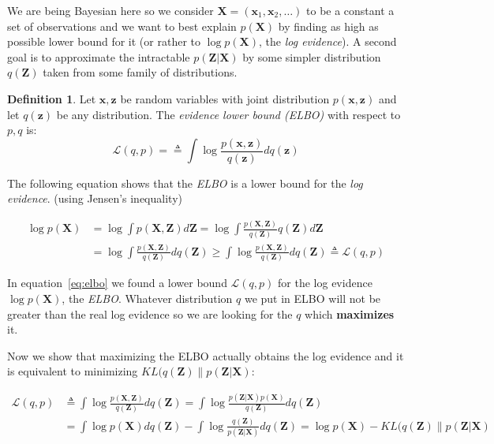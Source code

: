 \documentclass[11pt, a4paper]{report}
\theoremstyle{plain}
\theoremstyle{definition}
\newtheorem{mydef}{Definition}[chapter]
\theoremstyle{remark}
\newcommand{\bv}[1]{\boldsymbol{#1}}
\begin{document}
We are being Bayesian here so we consider $\bv{X} = (\bv{x}_1, \bv{x}_2, \dots)$ to be
a constant a set of observations and we want to best explain $p(\bv{X})$ by finding as
high as possible lower bound for it (or rather to $\log p(\bv{X})$, the \emph{log
evidence}).
A second goal is to approximate the intractable $p(\bv{Z}|\bv{X})$ by some simpler
distribution $q(\bv{Z})$ taken from some family of distributions.

\begin{mydef}
Let $\bv{x},\bv{z}$ be random variables with joint
distribution $p(\bv{x},\bv{z})$ and let $q(\bv{z})$ be any distribution.
The \emph{evidence lower bound (ELBO)} with respect to $p,q$ is:
\begin{equation}
\label{def:elbo}
\mathcal{L}(q,p) = 
\triangleq \int \log \frac{p(\bv{x},\bv{z})}{q(\bv{z})} d q(\bv{z})
\end{equation}
\end{mydef}

The following equation shows that the \emph{ELBO} is a lower bound for the \emph{log
evidence}.
(using Jensen's inequality)

\begin{equation}
\label{eq:elbo}
\begin{aligned}
\log p(\bv{X}) &= \log \int p(\bv{X},\bv{Z}) d\bv{Z} 
= \log \int \frac{p(\bv{X},\bv{Z})}{q(\bv{Z})} q(\bv{Z})d\bv{Z} \\
&= \log \int \frac{p(\bv{X},\bv{Z})}{q(\bv{Z})}dq(\bv{Z}) 
\geq \int \log \frac{p(\bv{X},\bv{Z})}{q(\bv{Z})}dq(\bv{Z}) 
\triangleq \mathcal{L}(q,p)
\end{aligned}
\end{equation}

In equation~\ref{eq:elbo} we found a lower bound $\mathcal{L}(q,p)$ for the log
evidence $\log p(\bv{X})$, the \emph{ELBO}.
Whatever distribution $q$ we put in ELBO will not be
greater than the real log evidence so we are looking for the $q$ which
\textbf{maximizes} it.

Now we show that maximizing the ELBO actually obtains the log evidence and it is
equivalent to minimizing $KL(q(\bv{Z}) \| p(\bv{Z}|\bv{X})$:

\begin{equation}\label{eq:kl_bound}
\begin{aligned}
\mathcal{L}(q,p) &\triangleq \int \log \frac{p(\bv{X},\bv{Z})}{q(\bv{Z})} d
q(\bv{Z})
= \int \log \frac{p(\bv{Z}|\bv{X})p(\bv{X})}{q(\bv{Z})} d q(\bv{Z}) \\
&= \int \log p(\bv{X}) dq(\bv{Z}) - \int \log \frac{q(\bv{Z})}{p(\bv{Z}|\bv{X})}
dq(\bv{Z}) 
= \log p(\bv{X}) - KL(q(\bv{Z}) \| p(\bv{Z}|\bv{X})
\end{aligned}
\end{equation}
\end{document}
